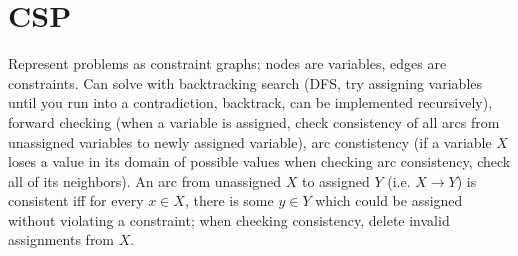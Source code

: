 \section{CSP}
Represent problems as constraint graphs; nodes are variables, edges are constraints. Can solve with backtracking search (DFS, try assigning variables until you run into a contradiction, backtrack, can be implemented recursively), forward checking (when a variable is assigned, check consistency of all arcs from unassigned variables to newly assigned variable), arc constistency (if a variable $X$ loses a value in its domain of possible values when checking arc consistency, check all of its neighbors). An arc from unassigned $X$ to assigned $Y$ (i.e. $X\rightarrow Y$) is consistent iff for every $x\in X$, there is some $y\in Y$ which could be assigned without violating a constraint; when checking consistency, delete invalid assignments from $X$.